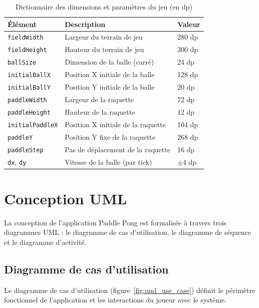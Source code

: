 \documentclass[12pt,a4paper]{report}
\begin{document}
\begin{table}[H]
\centering
\caption{Dictionnaire des dimensions et param\`etres du jeu (en dp)}
\label{tab:dimensions}
\begin{tabularx}{\textwidth}{lXl}
\toprule
\textbf{\'El\'ement} & \textbf{Description} & \textbf{Valeur} \\
\midrule
\texttt{fieldWidth} & Largeur du terrain de jeu & 280 dp \\
\texttt{fieldHeight} & Hauteur du terrain de jeu & 300 dp \\
\texttt{ballSize} & Dimension de la balle (carr\'e) & 24 dp \\
\texttt{initialBallX} & Position X initiale de la balle & 128 dp \\
\texttt{initialBallY} & Position Y initiale de la balle & 20 dp \\
\texttt{paddleWidth} & Largeur de la raquette & 72 dp \\
\texttt{paddleHeight} & Hauteur de la raquette & 12 dp \\
\texttt{initialPaddleX} & Position X initiale de la raquette & 104 dp \\
\texttt{paddleY} & Position Y fixe de la raquette & 268 dp \\
\texttt{paddleStep} & Pas de d\'eplacement de la raquette & 16 dp \\
\texttt{dx}, \texttt{dy} & Vitesse de la balle (par tick) & $\pm$4 dp \\
\bottomrule
\end{tabularx}
\end{table}

\section{Conception UML}
La conception de l'application Paddle Pong est formalis\'ee \`a travers trois diagrammes UML : le diagramme de cas d'utilisation, le diagramme de s\'equence et le diagramme d'activit\'e.

\subsection{Diagramme de cas d'utilisation}
Le diagramme de cas d'utilisation (figure~\ref{fig:uml_use_case}) d\'efinit le p\'erim\`etre fonctionnel de l'application et les interactions du joueur avec le syst\`eme.
\end{document}
